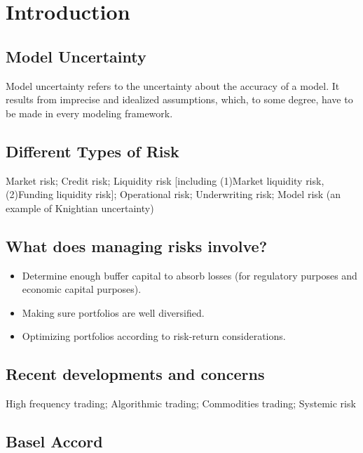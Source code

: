 \section{Introduction}
\subsection*{Model Uncertainty}
Model uncertainty refers to the uncertainty about the accuracy of a model. It results
from imprecise and idealized assumptions, which, to some degree, have to be made in every
modeling framework.

\subsection*{Different Types of Risk}
Market risk; Credit risk; Liquidity risk [including (1)Market liquidity risk, (2)Funding liquidity risk]; Operational risk; Underwriting risk; Model risk (an example of Knightian uncertainty)


\subsection*{What does managing risks involve?}
\begin{itemize}[leftmargin=*]
    \item Determine enough buffer capital to absorb losses (for regulatory purposes and economic capital purposes).
    \item Making sure portfolios are well diversified.
    \item Optimizing portfolios according to risk-return considerations.
\end{itemize}



\subsection*{Recent developments and concerns}
High frequency trading; Algorithmic trading; Commodities trading; Systemic risk



\subsection*{Basel Accord}
